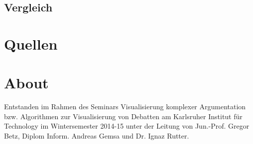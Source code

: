 \documentclass[a4paper, oneside]{scrartcl}
\begin{document}
\subsection{Vergleich}
% 

\section{Quellen}


\section*{About}
Entstanden im Rahmen des Seminars Visualisierung komplexer Argumentation bzw. Algorithmen zur Visualisierung von Debatten 
am Karlsruher Institut für Technology im Wintersemester 2014-15 unter der Leitung von 
Jun.-Prof. Gregor Betz, Diplom Inform. Andreas Gemsa und Dr. Ignaz Rutter.


\end{document}
